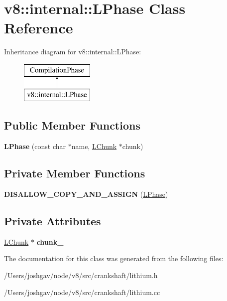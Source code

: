 \hypertarget{classv8_1_1internal_1_1_l_phase}{}\section{v8\+:\+:internal\+:\+:L\+Phase Class Reference}
\label{classv8_1_1internal_1_1_l_phase}
Inheritance diagram for v8\+:\+:internal\+:\+:L\+Phase\+:\begin{figure}[H]
\begin{center}
\leavevmode
\includegraphics[height=2.000000cm]{classv8_1_1internal_1_1_l_phase}
\end{center}
\end{figure}
\subsection*{Public Member Functions}
\begin{DoxyCompactItemize}
\item 
{\bfseries L\+Phase} (const char $\ast$name, \hyperlink{classv8_1_1internal_1_1_l_chunk}{L\+Chunk} $\ast$chunk)\hypertarget{classv8_1_1internal_1_1_l_phase_a70718adf2b978bb0bfc107856fa0f5f2}{}\label{classv8_1_1internal_1_1_l_phase_a70718adf2b978bb0bfc107856fa0f5f2}

\end{DoxyCompactItemize}
\subsection*{Private Member Functions}
\begin{DoxyCompactItemize}
\item 
{\bfseries D\+I\+S\+A\+L\+L\+O\+W\+\_\+\+C\+O\+P\+Y\+\_\+\+A\+N\+D\+\_\+\+A\+S\+S\+I\+GN} (\hyperlink{classv8_1_1internal_1_1_l_phase}{L\+Phase})\hypertarget{classv8_1_1internal_1_1_l_phase_a4dd3a1d5f8ae2f653f995e998300551c}{}\label{classv8_1_1internal_1_1_l_phase_a4dd3a1d5f8ae2f653f995e998300551c}

\end{DoxyCompactItemize}
\subsection*{Private Attributes}
\begin{DoxyCompactItemize}
\item 
\hyperlink{classv8_1_1internal_1_1_l_chunk}{L\+Chunk} $\ast$ {\bfseries chunk\+\_\+}\hypertarget{classv8_1_1internal_1_1_l_phase_abe2bfe0ef97f35fdd91c8ecef0f84151}{}\label{classv8_1_1internal_1_1_l_phase_abe2bfe0ef97f35fdd91c8ecef0f84151}

\end{DoxyCompactItemize}


The documentation for this class was generated from the following files\+:\begin{DoxyCompactItemize}
\item 
/\+Users/joshgav/node/v8/src/crankshaft/lithium.\+h\item 
/\+Users/joshgav/node/v8/src/crankshaft/lithium.\+cc\end{DoxyCompactItemize}
